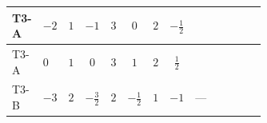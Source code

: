 \documentclass[8pt]{article}
\begin{document}
\begin{landscape}
\begin{longtable}{@{}llcccccc >{\raggedright\arraybackslash}p{0.21\linewidth} >{\raggedright\arraybackslash}p{0.21\linewidth} >{\raggedright\arraybackslash}p{0.21\linewidth}@{}}
\midrule
T3-A & $-2$ & $1$ & $-1$ & $3$ & $0$ & $2$ & $-\frac{1}{2}$ & \scriptsize\adjustbox{max width=\linewidth}{$\begin{gathered} {\lambda_{HS_1}^{(1)}} (4 T_{\nu}^{(1)}+6 \operatorname{Tr}\!\left({Y_d}\,\left({Y_d}\right)^{\dagger}\right)+2 \operatorname{Tr}\!\left({Y_e}\,\left({Y_e}\right)^{\dagger}\right)+6 \operatorname{Tr}\!\left({Y_u}\,\left({Y_u}\right)^{\dagger}\right))\end{gathered}$} & \scriptsize\adjustbox{max width=\linewidth}{$\begin{gathered} -4 \operatorname{Tr}\!\left({y_1}\,\left({y_1}\right)^{\dagger}\,{Y_e}\,\left({Y_e}\right)^{\dagger}\right)\end{gathered}$} & \scriptsize\adjustbox{max width=\linewidth}{$\begin{gathered} +12 {\lambda_5} \left({\lambda_5}\right)^{*}\end{gathered}$} \\
\midrule
T3-A & $0$ & $1$ & $0$ & $3$ & $1$ & $2$ & $\frac{1}{2}$ & \scriptsize\adjustbox{max width=\linewidth}{$\begin{gathered} {\lambda_{HS_1}^{(1)}} (4 T_{\nu}^{(1)}+6 \operatorname{Tr}\!\left({Y_d}\,\left({Y_d}\right)^{\dagger}\right)+2 \operatorname{Tr}\!\left({Y_e}\,\left({Y_e}\right)^{\dagger}\right)+6 \operatorname{Tr}\!\left({Y_u}\,\left({Y_u}\right)^{\dagger}\right))\end{gathered}$} & \scriptsize\adjustbox{max width=\linewidth}{$\begin{gathered} -4 \operatorname{Tr}\!\left({y_1}\,\left({y_1}\right)^{\dagger}\,{Y_e}\,\left({Y_e}\right)^{\dagger}\right)\end{gathered}$} & \scriptsize\adjustbox{max width=\linewidth}{$\begin{gathered} +12 {\lambda_5} \left({\lambda_5}\right)^{*}\end{gathered}$} \\
\midrule
T3-B & $-3$ & $2$ & $-\frac{3}{2}$ & $2$ & $-\frac{1}{2}$ & $1$ & $-1$ & --- & \scriptsize\adjustbox{max width=\linewidth}{$\begin{gathered} -2 \operatorname{Tr}\!\left({y_1}\,\left({y_1}\right)^{\dagger}\,{Y_e}\,\left({Y_e}\right)^{\dagger}\right)\end{gathered}$} & \scriptsize\adjustbox{max width=\linewidth}{$\begin{gathered} +6 {\lambda_5} \left({\lambda_5}\right)^{*}\end{gathered}$} \\
\midrule

\end{longtable}
\end{landscape}
\end{document}
